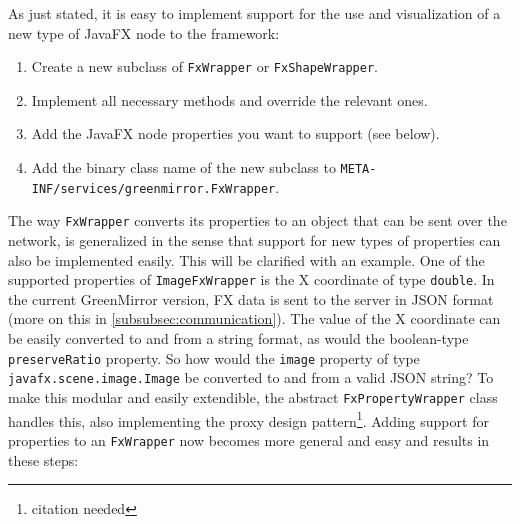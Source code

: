 \documentclass[a4paper]{article}
\begin{document}
	As just stated, it is easy to implement support for the use and visualization of a new type of JavaFX node to the framework:
	\begin{enumerate}
		\item Create a new subclass of \lstinline{FxWrapper} or \lstinline{FxShapeWrapper}.
		\item Implement all necessary methods and override the relevant ones.
		\item Add the JavaFX node properties you want to support (see below).
		\item Add the binary class name of the new subclass to \lstinline{META-INF/services/greenmirror.FxWrapper}.
	\end{enumerate}
	
	The way \lstinline{FxWrapper} converts its properties to an object that can be sent over the network, is generalized in the sense that support for new types of properties can also be implemented easily. This will be clarified with an example. One of the supported properties of \lstinline{ImageFxWrapper} is the X coordinate of type \lstinline{double}. In the current GreenMirror version, FX data is sent to the server in JSON format (more on this in \cref{subsubsec:communication}). The value of the X coordinate can be easily converted to and from a string format, as would the boolean-type \lstinline{preserveRatio} property. So how would the \lstinline{image} property of type \lstinline{javafx.scene.image.Image} be converted to and from a valid JSON string? To make this modular and easily extendible, the abstract \lstinline{FxPropertyWrapper} class handles this, also implementing the proxy design pattern\footnote{citation needed}. Adding support for properties to an \lstinline{FxWrapper} now becomes more general and easy and results in these steps:
\end{document}
